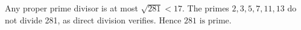Any proper prime divisor is at most $\sqrt{281}<17$. The primes $2,3,5,7,11,13$ do not divide 281, as direct division verifies. Hence $\boxed{281\text{ is prime}}$.
